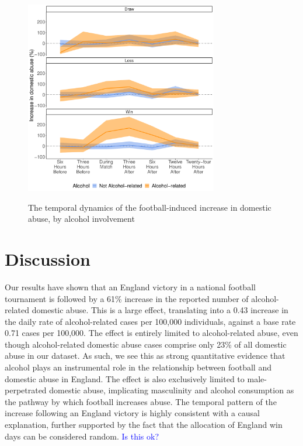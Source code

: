 \documentclass[12pt, letterpaper]{article}
\newcommand{\AT}[1] {{\textcolor{blue}{#1}}}
\begin{document}
\begin{figure}
\centering
 \caption{The temporal dynamics of the football-induced increase in domestic abuse, by alcohol involvement}
\includegraphics[width=0.75\textwidth]{Threehours.pdf}
\label{fig:threehours}
\end{figure}

\newpage

\section{Discussion}

Our results have shown that an England victory in a national football tournament is followed by a 61\% increase in the reported number of alcohol-related domestic abuse. This is a large effect, translating into a 0.43 increase in the daily rate of alcohol-related cases per 100,000 individuals, against a base rate 0.71 cases per 100,000. The effect is entirely limited to alcohol-related abuse, even though alcohol-related domestic abuse cases comprise only 23\% of all domestic abuse in our dataset. As such, we see this as strong quantitative evidence that alcohol plays an instrumental role in the relationship between football and domestic abuse in England. The effect is also exclusively limited to male-perpetrated domestic abuse, implicating masculinity and alcohol consumption as the pathway by which football increases abuse. The temporal pattern of the increase following an England victory is highly consistent with a causal explanation, further supported by the fact that the allocation of England win days can be considered random. \AT{Is this ok?}
\end{document}

